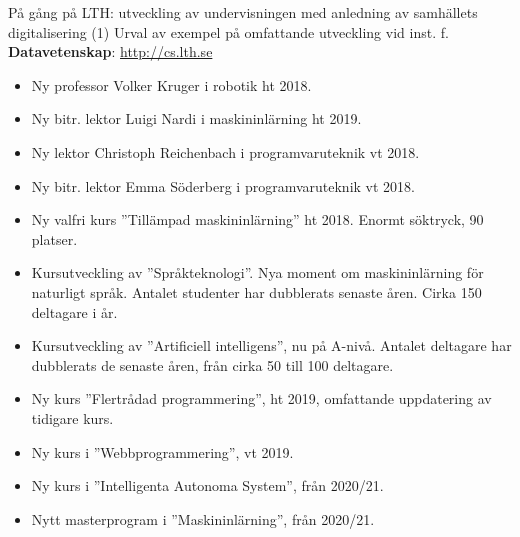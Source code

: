 \documentclass[aspectratio=169]{beamer}
\newenvironment{Slide}[1]%
  {\begin{frame}[environment=Slide]{#1}}
  {\end{frame}}%
\begin{document}
\begin{Slide}{På gång på LTH: utveckling av undervisningen med anledning av samhällets digitalisering (1)}
  Urval av exempel på omfattande utveckling vid inst. f. \\\textbf{Datavetenskap}:  \url{http://cs.lth.se}
  \begin{itemize}\footnotesize
    \item Ny professor Volker Kruger i robotik ht 2018. 
    \item Ny bitr. lektor Luigi Nardi i maskininlärning ht 2019. 
    \item Ny lektor Christoph Reichenbach i programvaruteknik vt 2018.
    \item Ny bitr. lektor Emma Söderberg i programvaruteknik vt 2018.
    \item Ny valfri kurs ''Tillämpad maskininlärning'' ht 2018. Enormt söktryck, 90 platser.
    \item Kursutveckling av ''Språkteknologi''. Nya moment om maskininlärning för naturligt språk.  Antalet studenter har dubblerats senaste åren. Cirka 150 deltagare i år.
    \item Kursutveckling av ''Artificiell intelligens'', nu på A-nivå. Antalet deltagare har dubblerats de senaste åren, från cirka 50 till 100 deltagare.
    \item Ny kurs ''Flertrådad programmering'', ht 2019, omfattande uppdatering av tidigare kurs.
    \item Ny kurs i ''Webbprogrammering'', vt 2019.
    \item Ny kurs i ''Intelligenta Autonoma System'', från 2020/21.
    \item Nytt masterprogram i ''Maskininlärning'', från 2020/21.
  \end{itemize}
\end{Slide}
\end{document}
